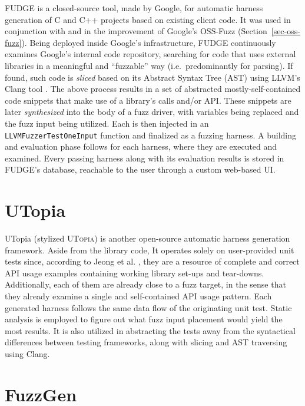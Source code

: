\documentclass[
  a4paper,
]{scrreprt}
\theoremstyle{definition}
\theoremstyle{remark}
\begin{document}
FUDGE \autocite{fudge} is a closed-source tool, made by Google, for
automatic harness generation of C and C++ projects based on existing
client code. It was used in conjunction with and in the improvement of
Google's OSS-Fuzz \autocite{oss-fuzz} (Section~\ref{sec-oss-fuzz}).
Being deployed inside Google's infrastructure, FUDGE continuously
examines Google's internal code repository, searching for code that uses
external libraries in a meaningful and ``fuzzable'' way
(i.e.~predominantly for parsing). If found, such code is \emph{sliced}
\autocite{sasirekha2011Slicing} based on its Abstract Syntax Tree (AST)
using LLVM's Clang tool \autocite{llvm}. The above process results in a
set of abstracted mostly-self-contained code snippets that make use of a
library's calls and/or API. These snippets are later \emph{synthesized}
into the body of a fuzz driver, with variables being replaced and the
fuzz input being utilized. Each is then injected in an
\texttt{LLVMFuzzerTestOneInput} function and finalized as a fuzzing
harness. A building and evaluation phase follows for each harness, where
they are executed and examined. Every passing harness along with its
evaluation results is stored in FUDGE's database, reachable to the user
through a custom web-based UI.

\section{UTopia}\label{utopia}

UTopia \autocite{utopia} (stylized \textsc{UTopia}) is another
open-source automatic harness generation framework. Aside from the
library code, It operates solely on user-provided unit tests since,
according to Jeong et al. \autocite{utopia}, they are a resource of
complete and correct API usage examples containing working library
set-ups and tear-downs. Additionally, each of them are already close to
a fuzz target, in the sense that they already examine a single and
self-contained API usage pattern. Each generated harness follows the
same data flow of the originating unit test. Static analysis is employed
to figure out what fuzz input placement would yield the most results. It
is also utilized in abstracting the tests away from the syntactical
differences between testing frameworks, along with slicing and AST
traversing using Clang.

\section{FuzzGen}\label{fuzzgen}
\end{document}
